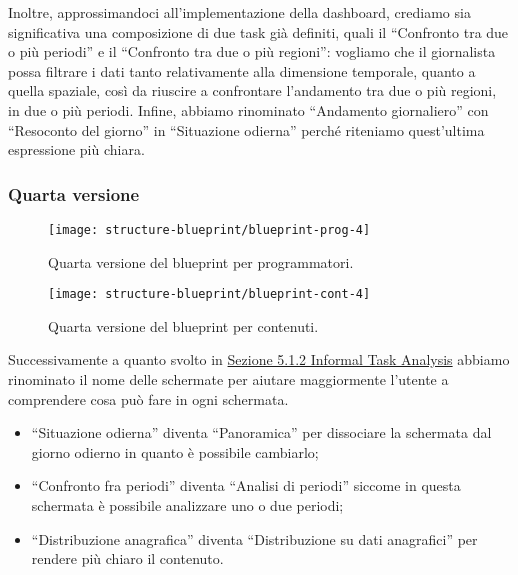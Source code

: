 Inoltre, approssimandoci all'implementazione della dashboard, crediamo sia significativa una composizione di due task già definiti, quali il ``Confronto tra due o più periodi'' e il ``Confronto tra due o più regioni'': vogliamo che il giornalista possa filtrare i dati tanto relativamente alla dimensione temporale, quanto a quella spaziale, così da riuscire a confrontare l'andamento tra due o più regioni, in due o più periodi.
Infine, abbiamo rinominato ``Andamento giornaliero'' con ``Resoconto del giorno'' in ``Situazione odierna'' perché riteniamo quest'ultima espressione più chiara. 

\subsubsection{Quarta versione}
\begin{figure}[H]
    \centering
    \texttt{[image: structure-blueprint/blueprint-prog-4]}
    \caption{Quarta versione del blueprint per programmatori.}\label{fig:blueprint-prog-4}
\end{figure}
\begin{figure}[H]
    \centering
    \texttt{[image: structure-blueprint/blueprint-cont-4]}
    \caption{Quarta versione del blueprint per contenuti.}\label{fig:blueprint-cont-4}
\end{figure}
Successivamente a quanto svolto in \hyperref[ss:informal-action-analysis]{Sezione 5.1.2 Informal Task Analysis} abbiamo rinominato il nome delle schermate per aiutare maggiormente l'utente a comprendere cosa può fare in ogni schermata.
\begin{itemize}
    \item ``Situazione odierna'' diventa ``Panoramica'' per dissociare la schermata dal giorno odierno in quanto è possibile cambiarlo;
    \item ``Confronto fra periodi'' diventa ``Analisi di periodi'' siccome in questa schermata è possibile analizzare uno o due periodi;
    \item ``Distribuzione anagrafica'' diventa ``Distribuzione su dati anagrafici'' per rendere più chiaro il contenuto.
\end{itemize}

